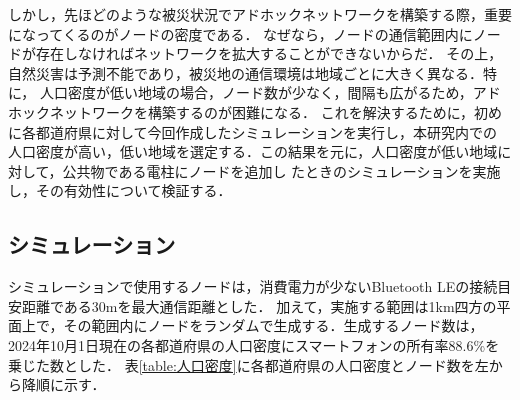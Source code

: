 \documentclass[a4paper, 11pt]{ltjsarticle}
\begin{document}
しかし，先ほどのような被災状況でアドホックネットワークを構築する際，重要になってくるのがノードの密度である．
なぜなら，ノードの通信範囲内にノードが存在しなければネットワークを拡大することができないからだ．
その上，自然災害は予測不能であり，被災地の通信環境は地域ごとに大きく異なる．特に，
人口密度が低い地域の場合，ノード数が少なく，間隔も広がるため，アドホックネットワークを構築するのが困難になる．
これを解決するために，初めに各都道府県に対して今回作成したシミュレーションを実行し，本研究内での
人口密度が高い，低い地域を選定する．この結果を元に，人口密度が低い地域に対して，公共物である電柱にノードを追加し
たときのシミュレーションを実施し，その有効性について検証する．

\subsection{シミュレーション}
シミュレーションで使用するノードは，消費電力が少ないBluetooth LEの接続目安距離である30mを最大通信距離とした．
加えて，実施する範囲は1km四方の平面上で，その範囲内にノードをランダムで生成する．生成するノード数は，
2024年10月1日現在の各都道府県の人口密度\cite{人口密度}にスマートフォンの所有率88.6\%を乗じた数とした．
表\ref{table:人口密度}に各都道府県の人口密度とノード数を左から降順に示す．
\end{document}
